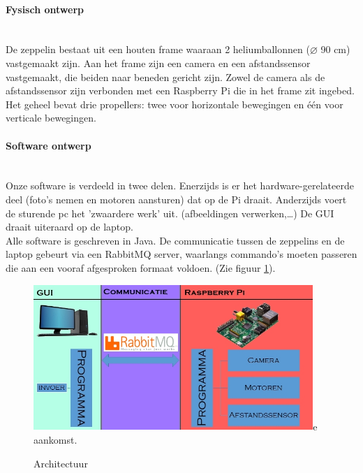 \documentclass[eind]{penoverslag}
\begin{document}
\paragraph{Fysisch ontwerp}
~\\
De zeppelin bestaat uit een houten frame waaraan 2 heliumballonnen ($\diameter$ 90 cm) vastgemaakt zijn. Aan het frame zijn een camera en een afstandssensor vastgemaakt, die beiden naar beneden gericht zijn. Zowel de camera als de afstandssensor zijn verbonden met een Raspberry Pi die in het frame zit ingebed. Het geheel bevat drie propellers: twee voor horizontale bewegingen en \'{e}\'{e}n voor verticale bewegingen.


\paragraph{Software ontwerp}
~\\
Onze software is verdeeld in twee delen. Enerzijds is er het hardware-gerelateerde deel (foto's nemen en motoren aansturen) dat op de Pi draait. Anderzijds voert de sturende pc het 'zwaardere werk' uit. (afbeeldingen verwerken,\ldots) De GUI draait uiteraard op de laptop. \\
Alle software is geschreven in Java. De communicatie tussen de zeppelins en de laptop gebeurt via een RabbitMQ server, waarlangs commando's moeten passeren die aan een vooraf afgesproken formaat voldoen. (Zie figuur \ref{schema}). \\

\begin{figure}[ht!]
\centering
\includegraphics[height=55mm]{Schema.jpg}e aankomst.
\caption{Architectuur}
\label{schema}
\end{figure}

\end{document}
